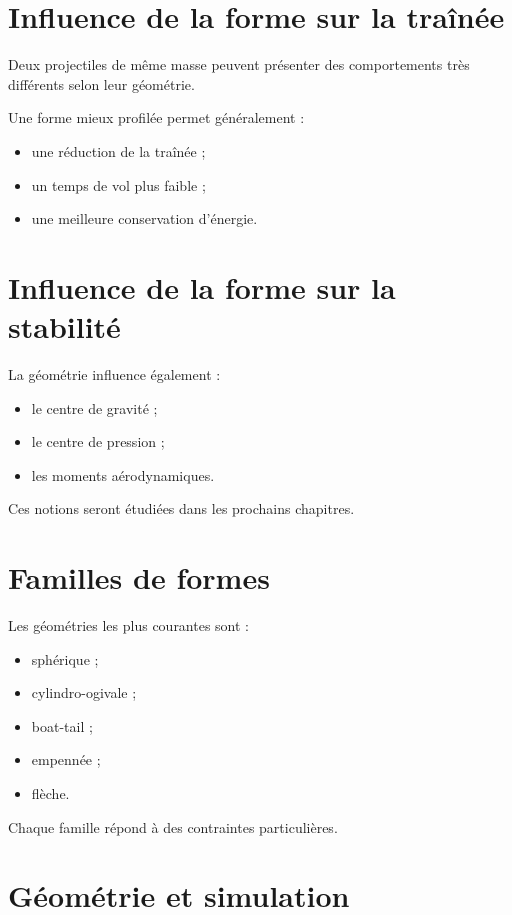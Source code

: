 \section{Influence de la forme sur la traînée}

Deux projectiles de même masse peuvent présenter des comportements très
différents selon leur géométrie.

Une forme mieux profilée permet généralement :

\begin{itemize}
    \item une réduction de la traînée ;
    \item un temps de vol plus faible ;
    \item une meilleure conservation d'énergie.
\end{itemize}

\section{Influence de la forme sur la stabilité}

La géométrie influence également :

\begin{itemize}
    \item le centre de gravité ;
    \item le centre de pression ;
    \item les moments aérodynamiques.
\end{itemize}

Ces notions seront étudiées dans les prochains chapitres.

\section{Familles de formes}

Les géométries les plus courantes sont :

\begin{itemize}
    \item sphérique ;
    \item cylindro-ogivale ;
    \item boat-tail ;
    \item empennée ;
    \item flèche.
\end{itemize}

Chaque famille répond à des contraintes particulières.

\section{Géométrie et simulation}


